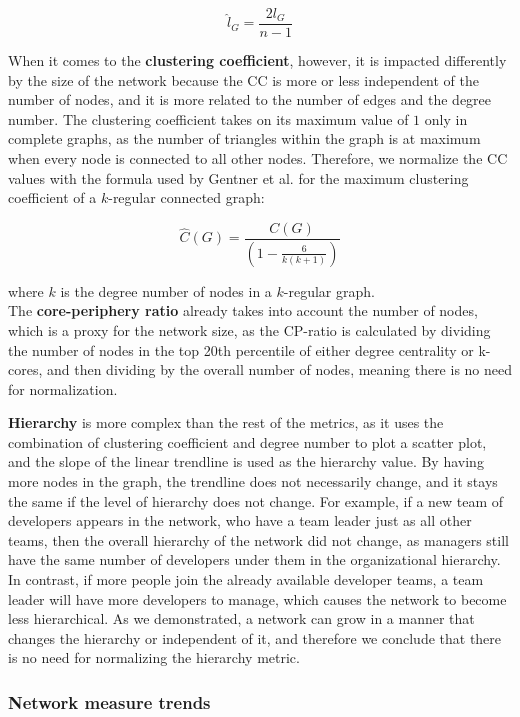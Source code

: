 \[ \hat{l}_G = \frac{2l_G}{n-1} \]

When it comes to the \textbf{clustering coefficient}, however, it is impacted differently by the size of the network because the CC is more or less independent of the number of nodes, and it is more related to the number of edges and the degree number. The clustering coefficient takes on its maximum value of $1$ only in complete graphs, as the number of triangles within the graph is at maximum when every node is connected to all other nodes. Therefore, we normalize the CC values with the formula used by Gentner et al. \cite{gentnerLargeValuesClustering2016} for the maximum clustering coefficient of a $k$-regular connected graph:

\[ \hat{C}(G) = \frac{C(G)}{(1-\frac{6}{k(k+1)})}\]

where $k$ is the degree number of nodes in a $k$-regular graph. \\

The \textbf{core-periphery ratio} already takes into account the number of nodes, which is a proxy for the network size, as the CP-ratio is calculated by dividing the number of nodes in the top 20th percentile of either degree centrality or k-cores, and then dividing by the overall number of nodes, meaning there is no need for normalization.

\textbf{Hierarchy} is more complex than the rest of the metrics, as it uses the combination of clustering coefficient and degree number to plot a scatter plot, and the slope of the linear trendline is used as the hierarchy value. By having more nodes in the graph, the trendline does not necessarily change, and it stays the same if the level of hierarchy does not change. For example, if a new team of developers appears in the network, who have a team leader just as all other teams, then the overall hierarchy of the network did not change, as managers still have the same number of developers under them in the organizational hierarchy. In contrast, if more people join the already available developer teams, a team leader will have more developers to manage, which causes the network to become less hierarchical. As we demonstrated, a network can grow in a manner that changes the hierarchy or independent of it, and therefore we conclude that there is no need for normalizing the hierarchy metric.

\subsubsection{Network measure trends}

